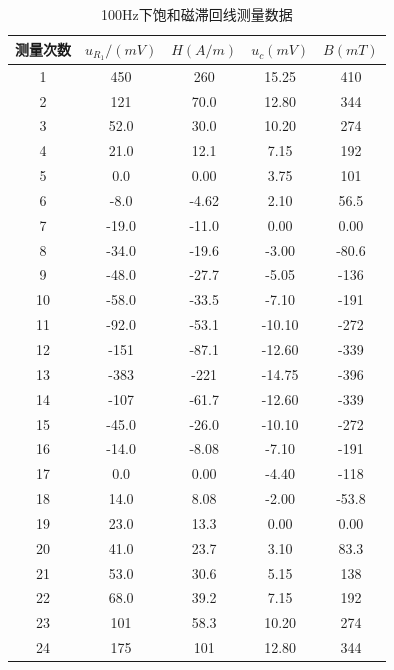 \documentclass{article}
\begin{document}
    \newpage
    \begin{table}[h]
        \centering
        \caption{100Hz下饱和磁滞回线测量数据}
        \vspace{1ex}
        \begin{tabular}{ccccc}
            \toprule
            测量次数  & $u_{R_1}/(mV)$ & $H(A/m)$ & $u_c(mV)$ & $B(mT)$ \\
            \midrule
            1     & 450  & 260  & 15.25  & 410  \\
            2     & 121  & 70.0  & 12.80  & 344  \\
            3     & 52.0  & 30.0  & 10.20  & 274  \\
            4     & 21.0  & 12.1  & 7.15  & 192  \\
            5     & 0.0   & 0.00  & 3.75  & 101  \\
            6     & -8.0  & -4.62  & 2.10  & 56.5  \\
            7     & -19.0  & -11.0  & 0.00  & 0.00  \\
            8     & -34.0  & -19.6  & -3.00  & -80.6  \\
            9     & -48.0  & -27.7  & -5.05  & -136  \\
            10    & -58.0  & -33.5  & -7.10  & -191  \\
            11    & -92.0  & -53.1  & -10.10  & -272  \\
            12    & -151  & -87.1  & -12.60  & -339  \\
            13    & -383  & -221  & -14.75  & -396  \\
            14    & -107  & -61.7  & -12.60  & -339  \\
            15    & -45.0  & -26.0  & -10.10  & -272  \\
            16    & -14.0  & -8.08  & -7.10  & -191  \\
            17    & 0.0   & 0.00  & -4.40  & -118  \\
            18    & 14.0  & 8.08  & -2.00  & -53.8  \\
            19    & 23.0  & 13.3  & 0.00  & 0.00  \\
            20    & 41.0  & 23.7  & 3.10  & 83.3  \\
            21    & 53.0  & 30.6  & 5.15  & 138  \\
            22    & 68.0  & 39.2  & 7.15  & 192  \\
            23    & 101  & 58.3  & 10.20  & 274  \\
            24    & 175  & 101  & 12.80  & 344  \\
            \bottomrule
        \end{tabular}%
    \end{table}
\end{document}
